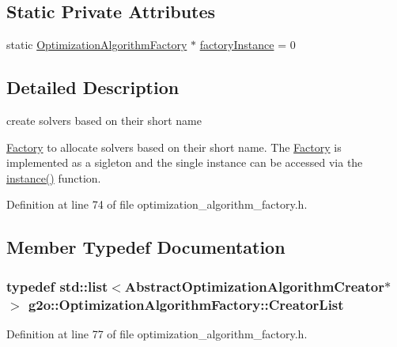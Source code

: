 \subsection*{Static Private Attributes}
\begin{DoxyCompactItemize}
\item 
static \hyperlink{classg2o_1_1OptimizationAlgorithmFactory}{Optimization\+Algorithm\+Factory} $\ast$ \hyperlink{classg2o_1_1OptimizationAlgorithmFactory_a688a34932a4e4c94e122dd81f35bb7ca}{factory\+Instance} = 0
\end{DoxyCompactItemize}


\subsection{Detailed Description}
create solvers based on their short name 

\hyperlink{classg2o_1_1Factory}{Factory} to allocate solvers based on their short name. The \hyperlink{classg2o_1_1Factory}{Factory} is implemented as a sigleton and the single instance can be accessed via the \hyperlink{classg2o_1_1OptimizationAlgorithmFactory_a4fe827a82f01c74ef124e7a9a9c98707}{instance()} function. 

Definition at line 74 of file optimization\+\_\+algorithm\+\_\+factory.\+h.



\subsection{Member Typedef Documentation}
\subsubsection[{\texorpdfstring{Creator\+List}{CreatorList}}]{\setlength{\rightskip}{0pt plus 5cm}typedef std\+::list$<${\bf Abstract\+Optimization\+Algorithm\+Creator}$\ast$$>$ {\bf g2o\+::\+Optimization\+Algorithm\+Factory\+::\+Creator\+List}}\hypertarget{classg2o_1_1OptimizationAlgorithmFactory_a3ed210b94bf09b47e30d07da3766b4ec}{}\label{classg2o_1_1OptimizationAlgorithmFactory_a3ed210b94bf09b47e30d07da3766b4ec}


Definition at line 77 of file optimization\+\_\+algorithm\+\_\+factory.\+h.



